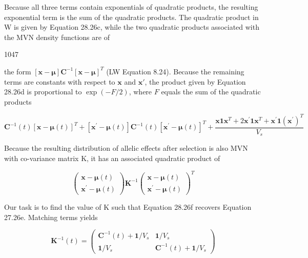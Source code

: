 \documentclass{article}
\begin{document}
Because all three terms contain exponentials of quadratic products, the resulting exponential term is the sum of the quadratic products. The quadratic product in W is given by Equation 28.26c, while the two quadratic products associated with the MVN density functions are of

1047

the form  $ [\mathbf{x} - \boldsymbol{\mu}] \mathbf{C}^{-1} [\mathbf{x} - \boldsymbol{\mu}]^T $ (LW Equation 8.24). Because the remaining terms are constants with respect to  $ \mathbf{x} $ and  $ \mathbf{x}' $, the product given by Equation 28.26d is proportional to  $ \exp(-F/2) $, where  $ F $ equals the sum of the quadratic products

\begin{equation}
[\mathbf{x}-\boldsymbol{\mu}(t)]\mathbf{C}^{-1}(t)[\mathbf{x}-\boldsymbol{\mu}(t)]^{T}+[\mathbf{x}^{\prime}-\boldsymbol{\mu}(t)]\mathbf{C}^{-1}(t)[\mathbf{x}^{\prime}-\boldsymbol{\mu}(t)]^{T}+\frac{\mathbf{x}\mathbf{1}\mathbf{x}^{T}+2\mathbf{x}^{\prime}\mathbf{1}\mathbf{x}^{T}+\mathbf{x}^{\prime}\mathbf{1}(\mathbf{x}^{\prime})^{T}}{V_{s}}
\tag{28.26e}
\label{eq:28_26e}
\end{equation}

Because the resulting distribution of allelic effects after selection is also MVN with co-variance matrix K, it has an associated quadratic product of

\begin{equation}
\begin{pmatrix}\mathbf{x}-\boldsymbol{\mu}(t)\\\mathbf{x}^{\prime}-\boldsymbol{\mu}(t)\end{pmatrix}\mathbf{K}^{-1}\begin{pmatrix}\mathbf{x}-\boldsymbol{\mu}(t)\\\mathbf{x}^{\prime}-\boldsymbol{\mu}(t)\end{pmatrix}^{T}
\tag{28.26f}
\label{eq:28_26f}
\end{equation}

Our task is to find the value of K such that Equation 28.26f recovers Equation 27.26e. Matching terms yields

\begin{equation}
\mathbf{K}^{-1}(t)=\begin{pmatrix}\mathbf{C}^{-1}(t)+\mathbf{1}/V_{s}&\mathbf{1}/V_{s}\\\mathbf{1}/V_{s}&\mathbf{C}^{-1}(t)+\mathbf{1}/V_{s}\end{pmatrix}
\tag{28.26g}
\label{eq:28_26g}
\end{equation}
\end{document}
